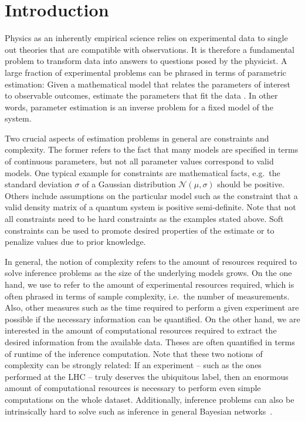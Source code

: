 
\chapter{Introduction}%
\label{chap:introduction}


Physics as an inherently empirical science relies on experimental data to single out theories that are compatible with observations.
It is therefore a fundamental problem to transform data into answers to questions posed by the physicist.
A large fraction of experimental problems can be phrased in terms of parametric estimation:
Given a mathematical model that relates the parameters of interest to observable outcomes, estimate the parameters that fit the data .
In other words, parameter estimation is an inverse problem for a fixed model of the system.

Two crucial aspects of estimation problems in general are constraints and complexity.
The former refers to the fact that many models are specified in terms of continuous parameters, but not all parameter values correspond to valid models.
One typical example for constraints are mathematical facts, e.g.\ the standard deviation $\sigma$ of a Gaussian distribution $\mathcal{N}(\mu, \sigma)$ should be positive.
Others include assumptions on the particular model such as the constraint that a valid density matrix of a quantum system is positive semi-definite.
Note that not all constraints need to be hard constraints as the examples stated above.
Soft constraints can be used to promote desired properties of the estimate or to penalize values due to prior knowledge.

In general, the notion of complexity refers to the amount of resources required to solve inference problems as the size of the underlying models grows.
On the one hand, we use  to refer to the amount of experimental resources required, which is often phrased in terms of sample complexity, i.e.\ the number of measurements.
Also, other measures such as the time required to perform a given experiment are possible if the necessary information can be quantified.
On the other hand, we are interested in the amount of computational resources required to extract the desired information from the available data.
Theses are often quantified in terms of runtime of the inference computation.
Note that these two notions of complexity can be strongly related:
If an experiment -- such as the ones performed at the LHC -- truly deserves the ubiquitous  label, then an enormous amount of computational resources is necessary to perform even simple computations on the whole dataset.
Additionally, inference problems can also be intrinsically hard to solve such as inference in general Bayesian networks~\cite{Coopercomputationalcomplexityprobabilistic1990,Rothhardnessapproximatereasoning1996}.



